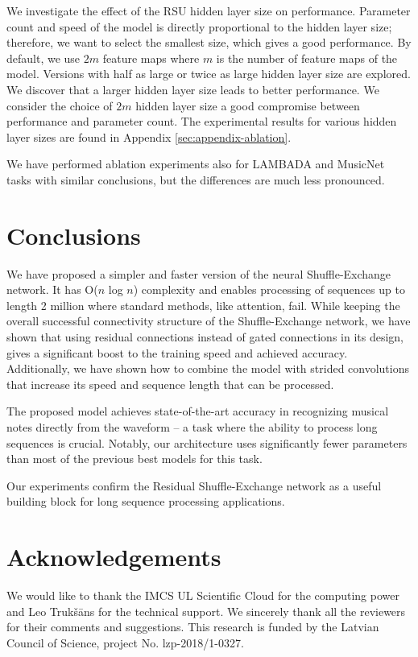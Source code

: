 \documentclass[letterpaper]{article} %
\begin{document}
We investigate the effect of the RSU hidden layer size on performance. Parameter count and speed of the model is directly proportional to the hidden layer size; therefore, we want to select the smallest size, which gives a good performance. By default, we use $2m$ feature maps where $m$ is the number of feature maps of the model. Versions with half as large or twice as large hidden layer size are explored. We discover that a larger hidden layer size leads to better performance. We consider the choice of $2m$ hidden layer size a good compromise between performance and parameter count. The experimental results for various hidden layer sizes are found in Appendix \ref{sec:appendix-ablation}.

We have performed ablation experiments also for LAMBADA and MusicNet tasks with similar conclusions, but the differences are much less pronounced.


\section{Conclusions}

We have proposed a simpler and faster version of the neural Shuffle-Exchange network. It has O($n$ log $n$) complexity and enables processing of sequences up to length 2 million where standard methods, like attention, fail. While keeping the overall successful connectivity structure of the Shuffle-Exchange network, we have shown that using residual connections instead of gated connections in its design, gives a significant boost to the training speed and achieved accuracy. Additionally, we have shown how to combine the model with strided convolutions that increase its speed and sequence length that can be processed.

The proposed model achieves state-of-the-art accuracy in recognizing musical notes directly from the waveform -- a task where the ability to process long sequences is crucial.
Notably, our architecture uses significantly fewer parameters than most of the previous best models for this task.

Our experiments confirm the Residual Shuffle-Exchange network as a useful building block for long sequence processing applications.


\section*{Acknowledgements}
We would like to thank the IMCS UL Scientific Cloud for the computing power and Leo Truk\v{s}\={a}ns for the technical support.
We sincerely thank all the reviewers for their comments and suggestions.
This research is funded by the Latvian Council of Science, project No. lzp-2018/1-0327.
\end{document}
